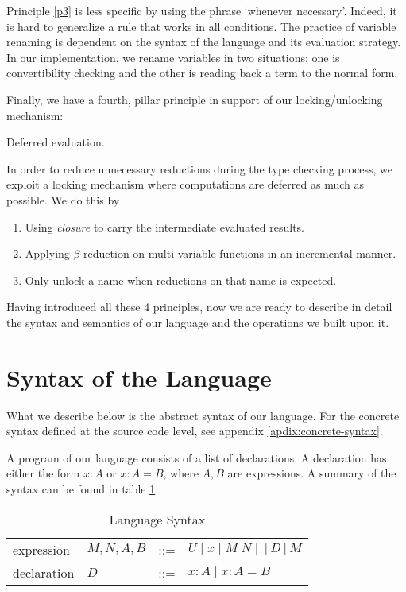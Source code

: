Principle \ref{p3} is less specific by using the phrase `whenever necessary'. Indeed, it is hard to generalize a rule that works in all conditions. The practice of variable renaming is dependent on the syntax of the language and its evaluation strategy. In our implementation, we rename variables in two situations: one is convertibility checking and the other is reading back a term to the normal form.

Finally, we have a fourth, pillar principle in support of our locking/unlocking mechanism:
\begin{principle} \label{p4}
  Deferred evaluation.
\end{principle}

In order to reduce unnecessary reductions during the type checking process, we exploit a locking mechanism where computations are deferred as much as possible. We do this by
\begin{enumerate}
\item Using \emph{closure} to carry the intermediate evaluated results.
\item Applying $\beta$-reduction on multi-variable functions in an incremental manner.
\item Only unlock a name when reductions on that name is expected.
\end{enumerate}

Having introduced all these 4 principles, now we are ready to describe in detail the syntax and semantics of our language and the operations we built upon it.

\section{Syntax of the Language}
What we describe below is the abstract syntax of our language. For the concrete syntax defined at the source code level, see appendix \ref{apdix:concrete-syntax}.

A program of our language consists of a list of declarations. A declaration has either the form $x : A$ or $x : A = B$, where $A, B$ are expressions. A summary of the syntax can be found in table \ref{tab:syntax}.

\begin{table}[h]
  \centering
  \begin{tabular}{l l l l}
    expression & $M,N,A,B$ & ::= & $U \mid x \mid M \; N \mid [D] M $ \\
    declaration & $D$ & ::= & $x : A \mid x : A = B$
  \end{tabular}
  \caption{Language Syntax}
  \label{tab:syntax}
\end{table}


